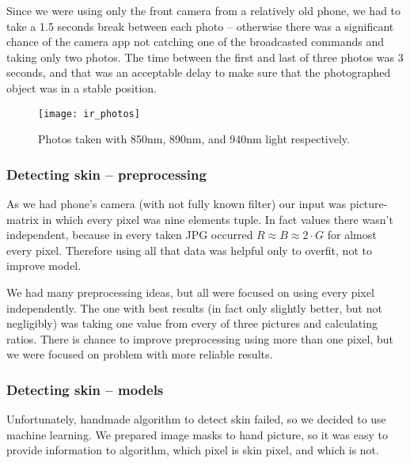             Since we were using only the front camera from a relatively old phone,
            we had to take a 1.5 seconds break between each photo -- otherwise
            there was a significant chance of the camera app not catching one of the
            broadcasted commands and taking only two photos.
            The time between the first and last of three photos was 3 seconds,
            and that was an acceptable delay to make sure that the photographed
            object was in a stable position.

            \begin{figure}[H]
                \caption{Photos taken with 850nm, 890nm, and 940nm light respectively.}
                \centering
                \texttt{[image: ir\_photos]}
                \label{fig:ir_photos}
            \end{figure}

            \subsubsection*{Detecting skin -- preprocessing}
                As we had phone's camera (with not fully known filter)
                our input was picture-matrix
                in which every pixel was nine elements tuple.
                In fact values there wasn't independent, because
                in every taken JPG occurred $R \approx B \approx 2 \cdot G$
                for almost every pixel.
                Therefore using all that data was helpful only to overfit,
                not to improve model.

                We had many preprocessing ideas, but all were focused
                on using every pixel independently.
                The one with best results (in fact only slightly better,
                but not negligibly) was taking one value from every
                of three pictures and calculating ratios.
                There is chance to improve preprocessing using more than one pixel,
                but we were focused on problem with more reliable results.

            \subsubsection*{Detecting skin -- models}
                Unfortunately, handmade algorithm to detect skin failed,
                so we decided to use machine learning.
                We prepared image masks to hand picture,
                so it was easy to provide information to algorithm, which
                pixel is skin pixel, and which is not.

